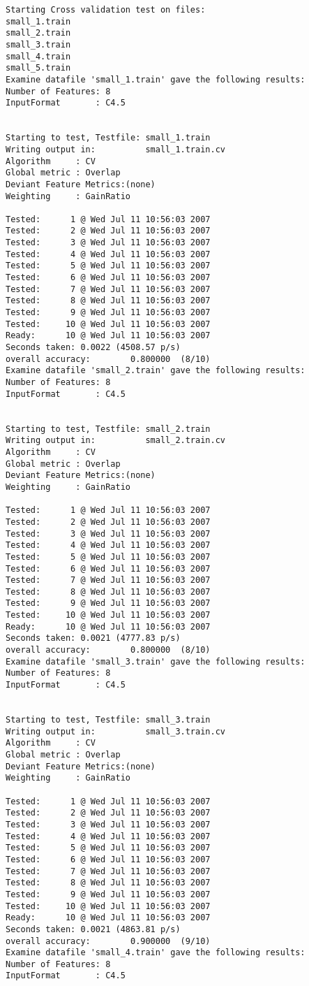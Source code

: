 \documentclass{report}
\begin{document}
\begin{footnotesize}
\begin{verbatim}
Starting Cross validation test on files:
small_1.train
small_2.train
small_3.train
small_4.train
small_5.train
Examine datafile 'small_1.train' gave the following results:
Number of Features: 8
InputFormat       : C4.5


Starting to test, Testfile: small_1.train
Writing output in:          small_1.train.cv
Algorithm     : CV
Global metric : Overlap
Deviant Feature Metrics:(none)
Weighting     : GainRatio

Tested:      1 @ Wed Jul 11 10:56:03 2007
Tested:      2 @ Wed Jul 11 10:56:03 2007
Tested:      3 @ Wed Jul 11 10:56:03 2007
Tested:      4 @ Wed Jul 11 10:56:03 2007
Tested:      5 @ Wed Jul 11 10:56:03 2007
Tested:      6 @ Wed Jul 11 10:56:03 2007
Tested:      7 @ Wed Jul 11 10:56:03 2007
Tested:      8 @ Wed Jul 11 10:56:03 2007
Tested:      9 @ Wed Jul 11 10:56:03 2007
Tested:     10 @ Wed Jul 11 10:56:03 2007
Ready:      10 @ Wed Jul 11 10:56:03 2007
Seconds taken: 0.0022 (4508.57 p/s)
overall accuracy:        0.800000  (8/10)
Examine datafile 'small_2.train' gave the following results:
Number of Features: 8
InputFormat       : C4.5


Starting to test, Testfile: small_2.train
Writing output in:          small_2.train.cv
Algorithm     : CV
Global metric : Overlap
Deviant Feature Metrics:(none)
Weighting     : GainRatio

Tested:      1 @ Wed Jul 11 10:56:03 2007
Tested:      2 @ Wed Jul 11 10:56:03 2007
Tested:      3 @ Wed Jul 11 10:56:03 2007
Tested:      4 @ Wed Jul 11 10:56:03 2007
Tested:      5 @ Wed Jul 11 10:56:03 2007
Tested:      6 @ Wed Jul 11 10:56:03 2007
Tested:      7 @ Wed Jul 11 10:56:03 2007
Tested:      8 @ Wed Jul 11 10:56:03 2007
Tested:      9 @ Wed Jul 11 10:56:03 2007
Tested:     10 @ Wed Jul 11 10:56:03 2007
Ready:      10 @ Wed Jul 11 10:56:03 2007
Seconds taken: 0.0021 (4777.83 p/s)
overall accuracy:        0.800000  (8/10)
Examine datafile 'small_3.train' gave the following results:
Number of Features: 8
InputFormat       : C4.5


Starting to test, Testfile: small_3.train
Writing output in:          small_3.train.cv
Algorithm     : CV
Global metric : Overlap
Deviant Feature Metrics:(none)
Weighting     : GainRatio

Tested:      1 @ Wed Jul 11 10:56:03 2007
Tested:      2 @ Wed Jul 11 10:56:03 2007
Tested:      3 @ Wed Jul 11 10:56:03 2007
Tested:      4 @ Wed Jul 11 10:56:03 2007
Tested:      5 @ Wed Jul 11 10:56:03 2007
Tested:      6 @ Wed Jul 11 10:56:03 2007
Tested:      7 @ Wed Jul 11 10:56:03 2007
Tested:      8 @ Wed Jul 11 10:56:03 2007
Tested:      9 @ Wed Jul 11 10:56:03 2007
Tested:     10 @ Wed Jul 11 10:56:03 2007
Ready:      10 @ Wed Jul 11 10:56:03 2007
Seconds taken: 0.0021 (4863.81 p/s)
overall accuracy:        0.900000  (9/10)
Examine datafile 'small_4.train' gave the following results:
Number of Features: 8
InputFormat       : C4.5



\end{verbatim}
\end{footnotesize}
\end{document}
